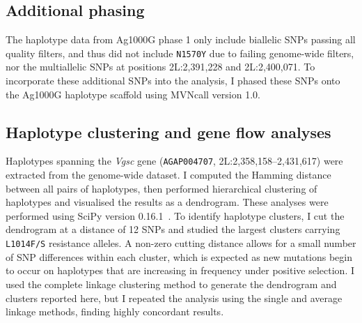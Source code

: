 \begin{refsection}
\subsection{Additional phasing}\label{subsec:methods-phasing}


The haplotype data from Ag1000G phase 1 only include biallelic SNPs passing all quality filters, and thus did not include \texttt{N1570Y} due to failing genome-wide filters, nor the multiallelic SNPs at positions 2L:2,391,228 and 2L:2,400,071.
%
To incorporate these additional SNPs into the analysis, I phased these SNPs onto the Ag1000G haplotype scaffold using MVNcall version 1.0.


\subsection{Haplotype clustering and gene flow analyses}\label{subsec:methods-hapclust}


Haplotypes spanning the \textit{Vgsc} gene (\texttt{AGAP004707}, 2L:2,358,158--2,431,617) were extracted from the genome-wide dataset.
%
I computed the Hamming distance between all pairs of haplotypes, then performed hierarchical clustering of haplotypes and visualised the results as a dendrogram.
%
These analyses were performed using SciPy version 0.16.1~\parencite{Virtanen2020}.
%
To identify haplotype clusters, I cut the dendrogram at a distance of 12 SNPs and studied the largest clusters carrying \texttt{L1014F/S} resistance alleles.
%
A non-zero cutting distance allows for a small number of SNP differences within each cluster, which is expected as new mutations begin to occur on haplotypes that are increasing in frequency under positive selection.
%
I used the complete linkage clustering method to generate the dendrogram and clusters reported here, but I repeated the analysis using the single and average linkage methods, finding highly concordant results.



\end{refsection}
